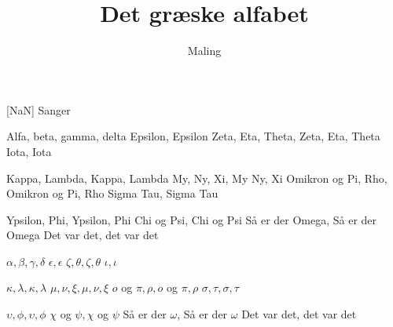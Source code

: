 \documentclass[a4paper,11pt]{article}
\title{Det græske alfabet}
\author{Maling}
\begin{document}
\maketitle

\begin{roles}
[NaN] Sanger
\end{roles}

\begin{song}
 Alfa, beta, gamma, delta
Epsilon, Epsilon
Zeta, Eta, Theta, Zeta, Eta, Theta
Iota, Iota

 Kappa, Lambda, Kappa, Lambda
My, Ny, Xi, My Ny, Xi
Omikron og Pi, Rho, Omikron og Pi, Rho
Sigma Tau, Sigma Tau

 Ypsilon, Phi, Ypsilon, Phi
Chi og Psi, Chi og Psi
Så er der Omega, Så er der Omega
Det var det, det var det

 $\alpha, \beta, \gamma, \delta$
$\epsilon, \epsilon$
$\zeta, \theta, \zeta, \theta$
$\iota, \iota$

 $\kappa, \lambda, \kappa, \lambda$
$\mu, \nu, \xi, \mu, \nu, \xi$
$o$ og $\pi, \rho, o$ og $\pi, \rho$
$\sigma, \tau, \sigma, \tau$

 $\upsilon, \phi, \upsilon, \phi$
$\chi$ og $\psi, \chi$ og $\psi$
Så er der $\omega$, Så er der $\omega$
Det var det, det var det
\end{song}
\end{document}
